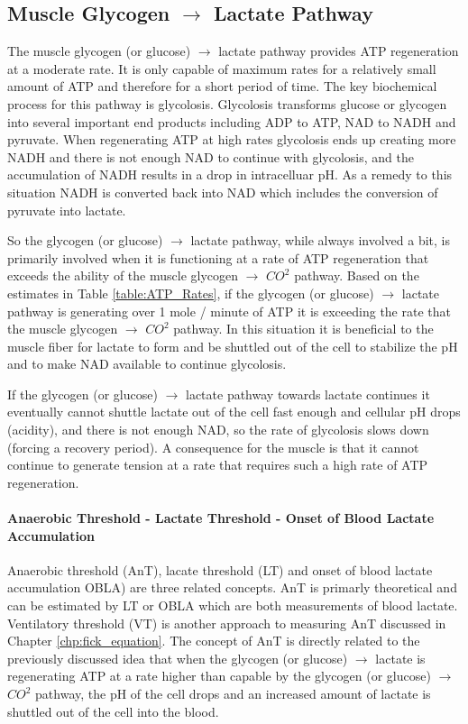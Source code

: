 \subsection{Muscle Glycogen $\rightarrow$ Lactate Pathway}

The muscle glycogen (or glucose) $\rightarrow$ lactate pathway provides ATP regeneration at a moderate rate. It is only capable of maximum rates for a relatively small amount of ATP and therefore for a short period of time. The key biochemical process for this pathway is glycolosis. 
Glycolosis transforms glucose or glycogen into several important end products including ADP to ATP, NAD to NADH and pyruvate. When regenerating ATP at high rates glycolosis ends up creating more NADH and there is not enough NAD to continue with glycolosis, and the accumulation of NADH results in a drop in intracelluar pH. As a remedy to this situation NADH is converted back into NAD which includes the conversion of pyruvate into lactate.

So the glycogen (or glucose) $\rightarrow$ lactate pathway, while always involved a bit, is primarily involved when it is functioning at a rate of ATP regeneration that exceeds the ability of the muscle glycogen $\rightarrow$ $CO^2$ pathway. Based on the estimates in Table \ref{table:ATP_Rates}, if the glycogen (or glucose) $\rightarrow$ lactate pathway is generating over 1 mole / minute of ATP it is exceeding the rate that the muscle glycogen $\rightarrow$ $CO^2$ pathway. In this situation it is beneficial to the muscle fiber for lactate to form and be shuttled out of the cell to stabilize the pH and to make NAD available to continue glycolosis. 

If the glycogen (or glucose) $\rightarrow$ lactate pathway towards lactate continues it eventually cannot shuttle lactate out of the cell fast enough and cellular pH drops (acidity), and there is not enough NAD, so the rate of glycolosis slows down (forcing a recovery period). A consequence for the muscle is that it cannot continue to generate tension at a rate that requires such a high rate of ATP regeneration.

\paragraph{Anaerobic Threshold - Lactate Threshold - Onset of Blood Lactate Accumulation}
Anaerobic threshold (AnT), lacate threshold (LT) and onset of blood lactate accumulation OBLA) are three related concepts. AnT is primarly theoretical and can be estimated by LT or OBLA which are both measurements of blood lactate. Ventilatory threshold (VT) is another approach to measuring AnT discussed in Chapter \ref{chp:fick_equation}. The concept of AnT is directly related to the previously discussed idea that when the glycogen (or glucose) $\rightarrow$ lactate is regenerating ATP at a rate higher than capable by the glycogen (or glucose) $\rightarrow$ $CO^2$ pathway, the pH of the cell drops and an increased amount of lactate is shuttled out of the cell into the blood.

